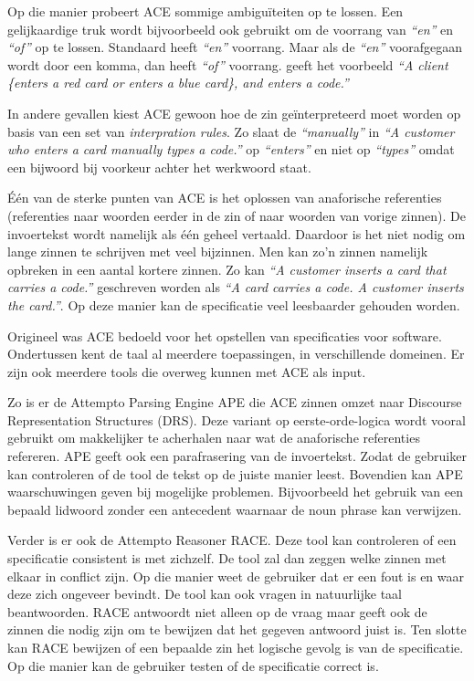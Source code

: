 \documentclass[]{article}
\theoremstyle{definition}
\newcommand{\example}[1]{\textit{``#1''}}
\begin{document}
Op die manier probeert ACE sommige ambiguïteiten op te lossen. Een gelijkaardige truk wordt bijvoorbeeld ook gebruikt om de voorrang van \example{en} en \example{of} op te lossen. Standaard heeft \example{en} voorrang. Maar als de \example{en} voorafgegaan wordt door een komma, dan heeft \example{of} voorrang. \cite{ACEConstructionRules} geeft het voorbeeld \example{A client \{enters a red card or enters a blue card\}, and enters a code.}

In andere gevallen kiest ACE gewoon hoe de zin geïnterpreteerd moet worden op basis van een set van \textit{interpration rules}. Zo slaat de \example{manually} in \example{A customer who {enters a card manually} types a code.}\cite{ACEConstructionRules} op \example{enters} en niet op \example{types} omdat een bijwoord bij voorkeur achter het werkwoord staat.

Één van de sterke punten van ACE is het oplossen van anaforische referenties (referenties naar woorden eerder in de zin of naar woorden van vorige zinnen). De invoertekst wordt namelijk als één geheel vertaald. Daardoor is het niet nodig om lange zinnen te schrijven met veel bijzinnen. Men kan zo'n zinnen namelijk opbreken in een aantal kortere zinnen. Zo kan \example{A customer inserts a card that carries a code.} geschreven worden als \example{A card carries a code. A customer inserts the card.}\cite{Fuchs2008}. Op deze manier kan de specificatie veel leesbaarder gehouden worden.

Origineel was ACE bedoeld voor het opstellen van specificaties voor software. Ondertussen kent de taal al meerdere toepassingen, in verschillende domeinen. Er zijn ook meerdere tools die overweg kunnen met ACE als input.

Zo is er de Attempto Parsing Engine APE die ACE zinnen omzet naar Discourse Representation Structures (DRS). Deze variant op eerste-orde-logica wordt vooral gebruikt om makkelijker te acherhalen naar wat de anaforische referenties refereren. APE geeft ook een parafrasering van de invoertekst. Zodat de gebruiker kan controleren of de tool de tekst op de juiste manier leest. Bovendien kan APE waarschuwingen geven bij mogelijke problemen. Bijvoorbeeld het gebruik van een bepaald lidwoord zonder een antecedent waarnaar de noun phrase kan verwijzen.

Verder is er ook de Attempto Reasoner RACE. Deze tool kan controleren of een specificatie consistent is met zichzelf. De tool zal dan zeggen welke zinnen met elkaar in conflict zijn. Op die manier weet de gebruiker dat er een fout is en waar deze zich ongeveer bevindt. De tool kan ook vragen in natuurlijke taal beantwoorden. RACE antwoordt niet alleen op de vraag maar geeft ook de zinnen die nodig zijn om te bewijzen dat het gegeven antwoord juist is. Ten slotte kan RACE bewijzen of een bepaalde zin het logische gevolg is van de specificatie. Op die manier kan de gebruiker testen of de specificatie correct is.
\end{document}

